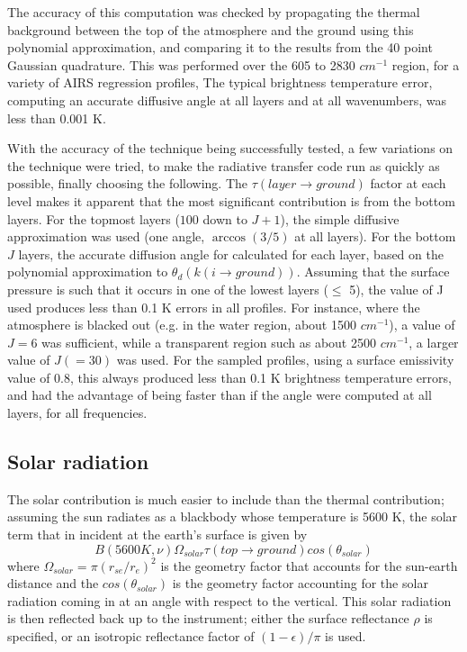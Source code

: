 \documentclass[11pt]{article}
\begin{document}
The accuracy of this computation was checked by propagating the
thermal background between the top of the atmosphere and the ground
using this polynomial approximation, and comparing it to the results
from the 40 point Gaussian quadrature. This was performed over the 605
to 2830 $cm^{-1}$ region, for a variety of AIRS regression profiles,
The typical brightness temperature error, computing an accurate diffusive 
angle at all layers and at all wavenumbers, was less than 0.001 K.

With the accuracy of the technique being successfully tested, a few 
variations on the technique were tried, to make the radiative transfer code 
run as quickly as possible, finally choosing the following. The 
$\tau(layer \rightarrow ground)$ factor at each level makes it apparent that 
the most significant contribution is from the bottom layers. For the topmost
layers ($100$ down to $J+1$), the simple diffusive approximation was
used (one angle, $\arccos(3/5)$ at all layers). For the bottom $J$
layers, the accurate diffusion angle for calculated for each layer,
based on the polynomial approximation to $\theta_{d}(k(i \rightarrow
ground))$. Assuming that the surface pressure is such that it occurs in one of
the lowest layers ($\leq$ 5), the value of J used produces less than 0.1 K 
errors in all profiles. For instance, where the atmosphere is blacked 
out (e.g. in the water region, about 1500 $cm^{-1}$), a value of $J=6$ was 
sufficient, while a transparent region such as about 2500 $cm^{-1}$, a larger 
value of $J(=30)$ was used. For the sampled profiles, using a surface 
emissivity value of 0.8, this always produced less than 0.1 K brightness 
temperature errors, and had the advantage of being faster than if the angle 
were computed at all layers, for all frequencies.

\subsection{Solar radiation}
The solar contribution is much easier to include than the thermal
contribution; assuming the sun radiates as a blackbody whose
temperature is 5600 K, the solar term that in incident at the earth's
surface is given by
\begin{equation}
 B(5600 K,\nu) \Omega_{solar} \tau(top \rightarrow ground) cos(\theta_{solar})
\end{equation}
where $\Omega_{solar} = \pi(r_{se}/r_{e})^{2}$ is the geometry factor
that accounts for the sun-earth distance and the $cos(\theta_{solar})$
is the geometry factor accounting for the solar radiation coming in at
an angle with respect to the vertical. This solar radiation is then
reflected back up to the instrument; either the surface reflectance $\rho$ is 
specified, or an isotropic reflectance factor of $(1-\epsilon)/\pi$ is used.
\end{document}

